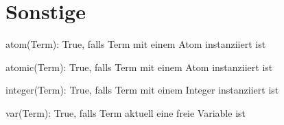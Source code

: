 \section{Sonstige}
\begin{compactitem}
	\item atom(Term): True, falls Term mit einem Atom instanziiert ist 
	\item atomic(Term): True, falls Term mit einem Atom instanziiert ist 
	\item integer(Term): True, falls Term mit einem Integer instanziiert ist
	\item var(Term): True, falls Term aktuell eine freie Variable ist
\end{compactitem}